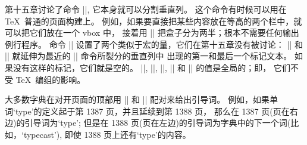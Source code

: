 \ddanger 第十五章讨论了命令 |\vsplit|, 它本身就可以分割垂直列。%
这个命令有时候可以用在 \TeX\ 普通的页面构建上。%
例如，如果要直接把某些内容放在等高的两个栏中，就可以把它们放在一个 vbox 中，
接着用 |\vsplit| 把盒子分为两半；根本不需要任何输出例行程序。%
命令 |\vsplit| 设置了两个类似于宏的量，它们在第十五章没有被讨论：
|\splitfirstmark| 和 |\splitbotmark| 就延伸为最近的 |\vsplit| 命令所裂分的垂直列中%
出现的第一和最后一个标记文本。%
如果没有这样的标记，它们就是空的。%
|\topmark|, |\firstmark|, |\botmark|,
|\splitfirstmark| 和 |\splitbotmark| 的值是全局的；即，
它们不受 \TeX\ 编组的影响。

\ddanger 大多数字典在对开页面的顶部用 |\firstmark| 和 |\botmark| 配对来给出引导词。%
例如，如果单词`type'的定义起于第 1387 页，并且延续到第 1388 页，
那么在 1387 页(页在右边)的引导词为`type';
但是在 1388 页(页在左边)的引导词为字典中的下一个词(比如，`typecast'),
即使 1388 页上还有`type'的内容。

